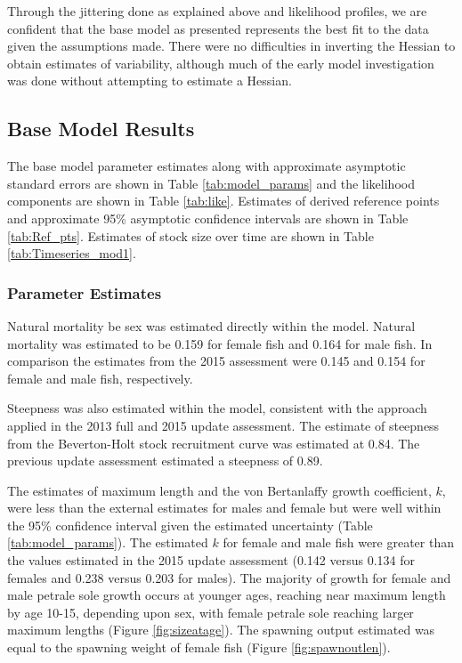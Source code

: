 \documentclass[12pt,]{article}
\begin{document}
Through the jittering done as explained above and likelihood profiles,
we are confident that the base model as presented represents the best
fit to the data given the assumptions made. There were no difficulties
in inverting the Hessian to obtain estimates of variability, although
much of the early model investigation was done without attempting to
estimate a Hessian.

\subsection{Base Model Results}\label{base-model-results}

The base model parameter estimates along with approximate asymptotic
standard errors are shown in Table \ref{tab:model_params} and the
likelihood components are shown in Table \ref{tab:like}. Estimates of
derived reference points and approximate 95\% asymptotic confidence
intervals are shown in Table \ref{tab:Ref_pts}. Estimates of stock size
over time are shown in Table \ref{tab:Timeseries_mod1}.

\subsubsection{Parameter Estimates}\label{parameter-estimates}

Natural mortality be sex was estimated directly within the model.
Natural mortality was estimated to be 0.159 for female fish and 0.164
for male fish. In comparison the estimates from the 2015 assessment were
0.145 and 0.154 for female and male fish, respectively.

Steepness was also estimated within the model, consistent with the
approach applied in the 2013 full and 2015 update assessment. The
estimate of steepness from the Beverton-Holt stock recruitment curve was
estimated at 0.84. The previous update assessment estimated a steepness
of 0.89.

The estimates of maximum length and the von Bertanlaffy growth
coefficient, \(k\), were less than the external estimates for males and
female but were well within the 95\% confidence interval given the
estimated uncertainty (Table \ref{tab:model_params}). The estimated
\(k\) for female and male fish were greater than the values estimated in
the 2015 update assessment (0.142 versus 0.134 for females and 0.238
versus 0.203 for males). The majority of growth for female and male
petrale sole growth occurs at younger ages, reaching near maximum length
by age 10-15, depending upon sex, with female petrale sole reaching
larger maximum lengths (Figure \ref{fig:sizeatage}). The spawning output
estimated was equal to the spawning weight of female fish (Figure
\ref{fig:spawnoutlen}).
\end{document}
